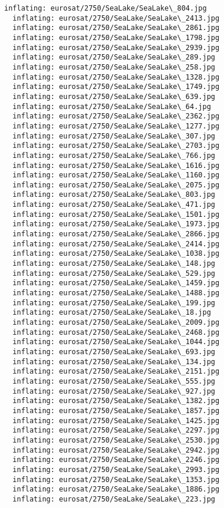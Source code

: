 \documentclass[11pt]{article}
\begin{document}
\begin{Verbatim}[commandchars=\\\{\}]
  inflating: eurosat/2750/SeaLake/SeaLake\_804.jpg
  inflating: eurosat/2750/SeaLake/SeaLake\_2413.jpg
  inflating: eurosat/2750/SeaLake/SeaLake\_2861.jpg
  inflating: eurosat/2750/SeaLake/SeaLake\_1798.jpg
  inflating: eurosat/2750/SeaLake/SeaLake\_2939.jpg
  inflating: eurosat/2750/SeaLake/SeaLake\_289.jpg
  inflating: eurosat/2750/SeaLake/SeaLake\_258.jpg
  inflating: eurosat/2750/SeaLake/SeaLake\_1328.jpg
  inflating: eurosat/2750/SeaLake/SeaLake\_1749.jpg
  inflating: eurosat/2750/SeaLake/SeaLake\_639.jpg
  inflating: eurosat/2750/SeaLake/SeaLake\_64.jpg
  inflating: eurosat/2750/SeaLake/SeaLake\_2362.jpg
  inflating: eurosat/2750/SeaLake/SeaLake\_1277.jpg
  inflating: eurosat/2750/SeaLake/SeaLake\_307.jpg
  inflating: eurosat/2750/SeaLake/SeaLake\_2703.jpg
  inflating: eurosat/2750/SeaLake/SeaLake\_766.jpg
  inflating: eurosat/2750/SeaLake/SeaLake\_1616.jpg
  inflating: eurosat/2750/SeaLake/SeaLake\_1160.jpg
  inflating: eurosat/2750/SeaLake/SeaLake\_2075.jpg
  inflating: eurosat/2750/SeaLake/SeaLake\_803.jpg
  inflating: eurosat/2750/SeaLake/SeaLake\_471.jpg
  inflating: eurosat/2750/SeaLake/SeaLake\_1501.jpg
  inflating: eurosat/2750/SeaLake/SeaLake\_1973.jpg
  inflating: eurosat/2750/SeaLake/SeaLake\_2866.jpg
  inflating: eurosat/2750/SeaLake/SeaLake\_2414.jpg
  inflating: eurosat/2750/SeaLake/SeaLake\_1038.jpg
  inflating: eurosat/2750/SeaLake/SeaLake\_148.jpg
  inflating: eurosat/2750/SeaLake/SeaLake\_529.jpg
  inflating: eurosat/2750/SeaLake/SeaLake\_1459.jpg
  inflating: eurosat/2750/SeaLake/SeaLake\_1488.jpg
  inflating: eurosat/2750/SeaLake/SeaLake\_199.jpg
  inflating: eurosat/2750/SeaLake/SeaLake\_18.jpg
  inflating: eurosat/2750/SeaLake/SeaLake\_2009.jpg
  inflating: eurosat/2750/SeaLake/SeaLake\_2468.jpg
  inflating: eurosat/2750/SeaLake/SeaLake\_1044.jpg
  inflating: eurosat/2750/SeaLake/SeaLake\_693.jpg
  inflating: eurosat/2750/SeaLake/SeaLake\_134.jpg
  inflating: eurosat/2750/SeaLake/SeaLake\_2151.jpg
  inflating: eurosat/2750/SeaLake/SeaLake\_555.jpg
  inflating: eurosat/2750/SeaLake/SeaLake\_927.jpg
  inflating: eurosat/2750/SeaLake/SeaLake\_1382.jpg
  inflating: eurosat/2750/SeaLake/SeaLake\_1857.jpg
  inflating: eurosat/2750/SeaLake/SeaLake\_1425.jpg
  inflating: eurosat/2750/SeaLake/SeaLake\_2297.jpg
  inflating: eurosat/2750/SeaLake/SeaLake\_2530.jpg
  inflating: eurosat/2750/SeaLake/SeaLake\_2942.jpg
  inflating: eurosat/2750/SeaLake/SeaLake\_2246.jpg
  inflating: eurosat/2750/SeaLake/SeaLake\_2993.jpg
  inflating: eurosat/2750/SeaLake/SeaLake\_1353.jpg
  inflating: eurosat/2750/SeaLake/SeaLake\_1886.jpg
  inflating: eurosat/2750/SeaLake/SeaLake\_223.jpg

\end{Verbatim}
\end{document}
